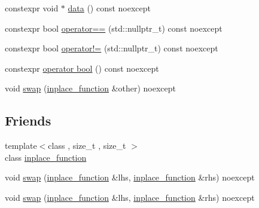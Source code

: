 \begin{DoxyCompactItemize}
\item 
constexpr void $\ast$ \hyperlink{classstdext_1_1inplace__function_3_01R_07Args_8_8_8_08_00_01Capacity_00_01Alignment_01_4_a2fc2327b65754cc6c20d37d76cb86aa9}{data} () const noexcept
\item 
constexpr bool \hyperlink{classstdext_1_1inplace__function_3_01R_07Args_8_8_8_08_00_01Capacity_00_01Alignment_01_4_a174b90228b202356b44b3fa91ae566e0}{operator==} (std\+::nullptr\+\_\+t) const noexcept
\item 
constexpr bool \hyperlink{classstdext_1_1inplace__function_3_01R_07Args_8_8_8_08_00_01Capacity_00_01Alignment_01_4_a0991678f0a58072f1f3f89919fe92676}{operator!=} (std\+::nullptr\+\_\+t) const noexcept
\item 
constexpr \hyperlink{classstdext_1_1inplace__function_3_01R_07Args_8_8_8_08_00_01Capacity_00_01Alignment_01_4_a8fa4d88e328279b050356c0968ec0498}{operator bool} () const noexcept
\item 
void \hyperlink{classstdext_1_1inplace__function_3_01R_07Args_8_8_8_08_00_01Capacity_00_01Alignment_01_4_a7524f21e7df2da0b701d6948c0936956}{swap} (\hyperlink{classstdext_1_1inplace__function}{inplace\+\_\+function} \&other) noexcept
\end{DoxyCompactItemize}
\subsection*{Friends}
\begin{DoxyCompactItemize}
\item 
{\footnotesize template$<$class , size\+\_\+t , size\+\_\+t $>$ }\\class \hyperlink{classstdext_1_1inplace__function_3_01R_07Args_8_8_8_08_00_01Capacity_00_01Alignment_01_4_a5b4d4b71b2852dbb67897387c2e31957}{inplace\+\_\+function}
\item 
void \hyperlink{classstdext_1_1inplace__function_3_01R_07Args_8_8_8_08_00_01Capacity_00_01Alignment_01_4_ac652007694c3840de1d307fc57b972f5}{swap} (\hyperlink{classstdext_1_1inplace__function}{inplace\+\_\+function} \&lhs, \hyperlink{classstdext_1_1inplace__function}{inplace\+\_\+function} \&rhs) noexcept
\item 
void \hyperlink{classstdext_1_1inplace__function_3_01R_07Args_8_8_8_08_00_01Capacity_00_01Alignment_01_4_ac652007694c3840de1d307fc57b972f5}{swap} (\hyperlink{classstdext_1_1inplace__function}{inplace\+\_\+function} \&lhs, \hyperlink{classstdext_1_1inplace__function}{inplace\+\_\+function} \&rhs) noexcept
\end{DoxyCompactItemize}



